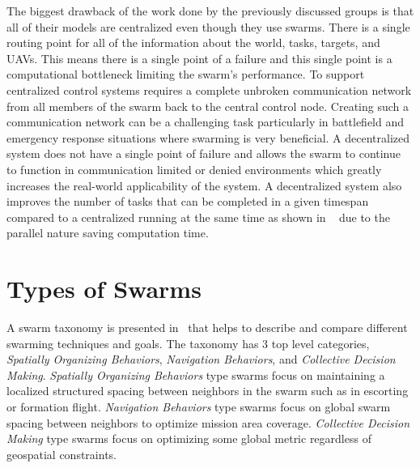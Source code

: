 The biggest drawback of the work done by the previously discussed groups is that all of their models are centralized even though they use swarms.  There is a single routing point for all of the information about the world, tasks, targets, and UAVs.  This means there is a single point of a failure and this single point is a computational bottleneck limiting the swarm's performance.  To support centralized control systems requires a complete unbroken communication network from all members of the swarm back to the central control node.  Creating such a communication network can be a challenging task particularly in battlefield and emergency response situations where swarming is very beneficial.  A decentralized system does not have a single point of failure and allows the swarm to continue to function in communication limited or denied environments which greatly increases the real-world applicability of the system.  A decentralized system also improves the number of tasks that can be completed in a given timespan compared to a centralized running at the same time as shown in ~\citet{chien} due to the parallel nature saving computation time.  

\section{Types of Swarms}
\label{sec:types_swarms}
A swarm taxonomy is presented in~\citet{iridia} that helps to describe and compare different swarming techniques and goals. The taxonomy has 3 top level categories, \textit{Spatially Organizing Behaviors}, \textit{Navigation Behaviors}, and \textit{Collective Decision Making}.  \textit{Spatially Organizing Behaviors} type swarms focus on maintaining a localized structured spacing between neighbors in the swarm such as in escorting or formation flight.  \textit{Navigation Behaviors} type swarms focus on global swarm spacing between neighbors to optimize mission area coverage.  \textit{Collective Decision Making} type swarms focus on optimizing some global metric regardless of geospatial constraints.

